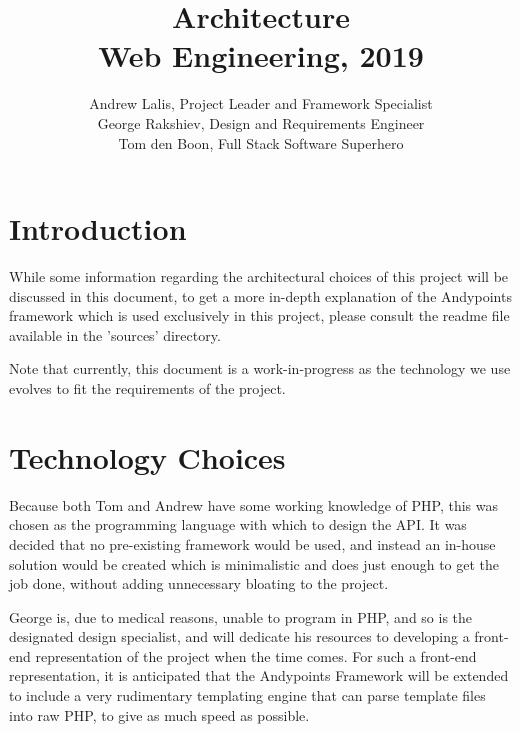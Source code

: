 \documentclass{article}
\title{Architecture \\ \small{Web Engineering, 2019}}
\author{Andrew Lalis, Project Leader and Framework Specialist \\ 
George Rakshiev, Design and Requirements Engineer \\ 
Tom den Boon, Full Stack Software Superhero}
\begin{document}
\maketitle

\section{Introduction}
	While some information regarding the architectural choices of this project will be discussed in this document, to get a more in-depth explanation of the Andypoints framework which is used exclusively in this project, please consult the readme file available in the 'sources' directory.
	
	Note that currently, this document is a work-in-progress as the technology we use evolves to fit the requirements of the project.
	
\section{Technology Choices}
	Because both Tom and Andrew have some working knowledge of PHP, this was chosen as the programming language with which to design the API. It was decided that no pre-existing framework would be used, and instead an in-house solution would be created which is minimalistic and does just enough to get the job done, without adding unnecessary bloating to the project.
	
	George is, due to medical reasons, unable to program in PHP, and so is the designated design specialist, and will dedicate his resources to developing a front-end representation of the project when the time comes. For such a front-end representation, it is anticipated that the Andypoints Framework will be extended to include a very rudimentary templating engine that can parse template files into raw PHP, to give as much speed as possible.
\end{document}
